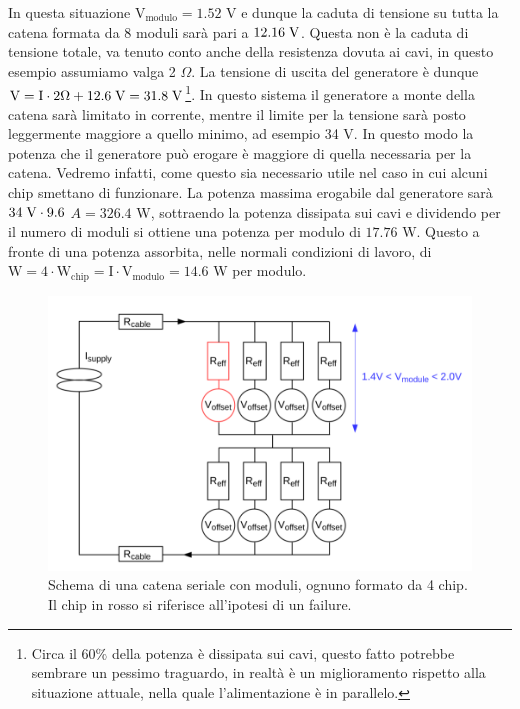 In questa situazione $\mathrm{V_{modulo}=1.52}$ V e dunque la caduta di tensione su tutta la catena formata da 8 moduli sarà pari a $12.16 \rm \; V$. Questa non è la caduta di tensione totale, va tenuto conto anche della resistenza dovuta ai cavi, in questo esempio assumiamo valga 2 $\Omega$. 
La tensione di uscita del generatore è dunque $\mathrm{V=I \cdot 2 \Omega +12.6 \rm \; V=31.8 \rm \; V}$\footnote{Circa il $60 \%$ della potenza è dissipata sui cavi, questo fatto potrebbe sembrare un pessimo traguardo, in realtà è un miglioramento rispetto alla situazione attuale, nella quale l'alimentazione è in parallelo.}.%
In questo sistema il generatore a monte della catena sarà limitato in corrente, mentre il limite per la tensione sarà posto leggermente maggiore a quello minimo, ad esempio 34 V. 
In questo modo la potenza che il generatore può erogare è maggiore di quella necessaria per la catena. 
Vedremo infatti, come questo sia necessario utile nel caso in cui alcuni chip smettano di funzionare. 
La potenza massima erogabile dal generatore sarà $34 \rm \; V \cdot 9.6$ $A = 326.4$ W, sottraendo la potenza dissipata sui cavi e dividendo per il numero di moduli si ottiene una potenza per modulo di $17.76$ W. Questo a fronte  di una potenza assorbita, nelle normali condizioni di lavoro, di $\mathrm{W = 4 \cdot W_{chip} = I \cdot V_{modulo} = 14.6}$ W per modulo.

\begin{figure}
\centering
\includegraphics[scale=.3]{Immagini/MultiChipModules}
\caption{Schema di una catena seriale con moduli, ognuno formato da 4 chip. Il chip in rosso si riferisce all'ipotesi di un failure.}
\label{MCM}
\end{figure}


